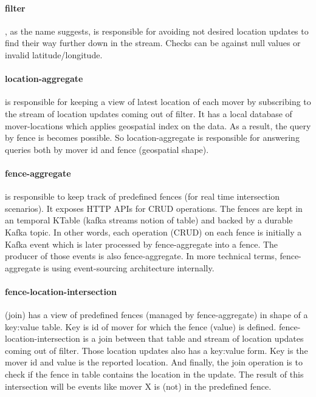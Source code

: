 \documentclass[a4]{report}
\begin{document}
    \paragraph{filter}, as the name suggests, is responsible for avoiding not desired location updates to find their way further down in the stream. Checks can be against null values or invalid latitude/longitude.

    \paragraph{location-aggregate} is responsible for keeping a view of latest location of each mover by subscribing to the stream of location updates coming out of filter. It has a local database of mover-locations which applies geospatial index on the data. As a result, the query by fence is becomes possible. So location-aggregate is responsible for answering queries both by mover id and fence (geospatial shape).

    \paragraph{fence-aggregate} is responsible to keep track of predefined fences (for real time intersection scenarios).
    It exposes HTTP APIs for CRUD operations.
    The fences are kept in an temporal KTable (kafka streams notion of table) and backed by a durable Kafka topic.
    In other words, each operation (CRUD) on each fence is initially a Kafka event which is later processed by fence-aggregate into a fence. The producer of those events is also fence-aggregate. In more technical terms, fence-aggregate is using event-sourcing architecture internally.

    \paragraph{fence-location-intersection} (join) has a view of predefined fences (managed by fence-aggregate) in shape of a key:value table.
    Key is id of mover for which the fence (value) is defined.
    fence-location-intersection is a join between that table and stream of location updates coming out of filter.
    Those location updates also has a key:value form. Key is the mover id and value is the reported location.
    And finally, the join operation is to check if the fence in table contains the location in the update.
    The result of this intersection will be events like mover X is (not) in the predefined fence.
\end{document}
